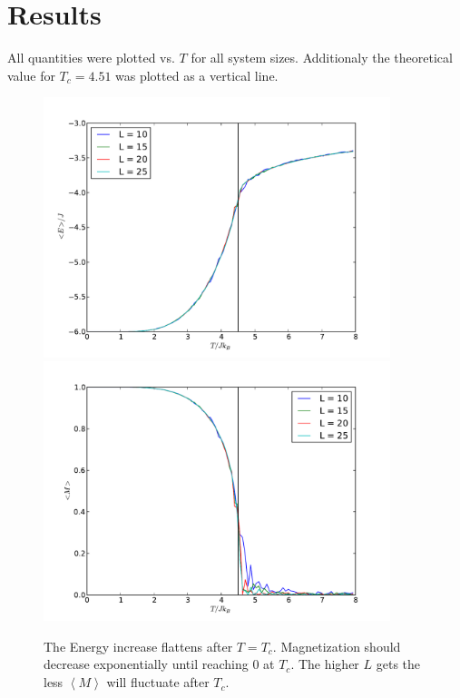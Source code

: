 \documentclass[a4paper]{scrreprt}
\begin{document}
\section*{Results}

All quantities were plotted vs. $T$ for all system sizes. Additionaly the theoretical value for $T_c = 4.51$
was plotted as a vertical line.

\begin{figure}[h!]
    \begin{center}
        \includegraphics[width=0.9\textwidth]{energy} \\
        \includegraphics[width=0.9\textwidth]{magnetization}
    \end{center}
    \caption*{The Energy increase flattens after $T=T_c$. 
            Magnetization should decrease exponentially until reaching 0 at $T_c$.
            The higher $L$ gets the less $\left<M\right>$ will fluctuate after $T_c$.}
    \label{fig:ex6res}
\end{figure}
\end{document}
